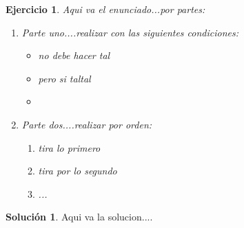 \documentclass[11pt,a4paper]{article}
\newtheorem{ejercicio}{Ejercicio}
\theoremstyle{definition}
\newtheorem{solucion}{Soluci\'on}
\begin{document}
\begin{ejercicio}
  Aqui va el enunciado...por partes:
  \begin{enumerate}
    \item Parte uno....realizar con las siguientes condiciones:
    \begin{itemize}
      \item no debe hacer tal
      
      \item pero si taltal
      
      \item
    \end{itemize}
    
    \item Parte dos....realizar por orden:
    \begin{enumerate}
      \item tira lo primero
      
      \item tira por lo segundo
      
      \item ...
    \end{enumerate}
  \end{enumerate}
\end{ejercicio}

\bigskip




\begin{solucion}
  Aqui va la solucion....
\end{solucion}
\end{document}
